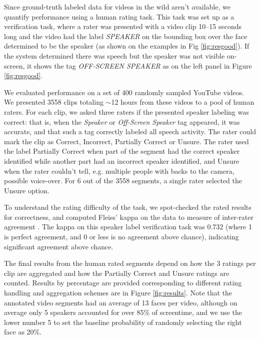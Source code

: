 \documentclass[a4paper]{article}
\begin{document}
Since ground-truth labeled data for videos in the wild aren't available, we quantify performance using a human rating task. This task was set up as a verification task, where a rater was presented with a video clip 10--15 seconds long and the video had the label {\it SPEAKER} on the bounding box over the face determined to be the speaker (as shown on the examples in Fig \ref{fig:resgood}). If the system determined there was speech but the speaker was not visible on-screen, it shows the tag {\it OFF-SCREEN SPEAKER} as on the left panel in Figure \ref{fig:resgood}.


We evaluated performance on a set of 400 randomly sampled YouTube videos. We presented 3558 clips totaling $\sim$12 hours from these videos to a pool of human raters. For each clip, we asked three raters if the presented speaker labeling was correct: that is, when the {\it Speaker} or {\it Off-Screen Speaker} tag appeared, it was accurate, and that such a tag correctly labeled all speech activity. The rater could mark the clip as Correct, Incorrect, Partially Correct or Unsure. The rater used the label Partially Correct when part of the segment had the correct speaker identified while another part had an incorrect speaker identified, and Unsure when the rater couldn't tell, e.g. multiple people with backs to the camera, possible voice-over. For 6 out of the 3558 segments, a single rater selected the Unsure option.

To understand the rating difficulty of the task, we spot-checked the rated results for correctness, and computed Fleiss' kappa on the data to measure of inter-rater agreement \cite{Fle71}. The kappa on this speaker label verification task was 0.732 (where 1 is perfect agreement, and 0 or less is no agreement above chance), indicating significant agreement above chance. 

The final results from the human rated segments depend on how the 3 ratings per clip are aggregated and how the Partially Correct and Unsure ratings are counted. Results by percentage are provided corresponding to different rating handling and aggregation schemes are in Figure \ref{fig:results}. Note that the annotated video segments had an average of 13 faces per video, although on average only 5 speakers accounted for over 85\% of screentime, and we use the lower number 5 to set the baseline probability of randomly selecting the right face as 20\%. 
\end{document}
